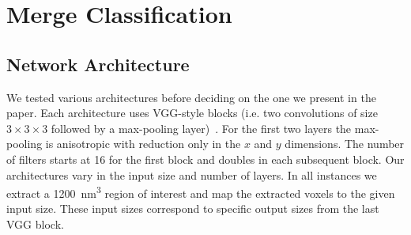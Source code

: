 \section{Merge Classification}

\subsection{Network Architecture}

We tested various architectures before deciding on the one we present in the paper. 
Each architecture uses VGG-style blocks (i.e. two convolutions of size $3\times3\times3$ followed by a max-pooling layer)~\cite{chatfield2014return}.
For the first two layers the max-pooling is anisotropic with reduction only in the $x$ and $y$ dimensions. 
The number of filters starts at 16 for the first block and doubles in each subsequent block.
Our architectures vary in the input size and number of layers. 
In all instances we extract a \SI{1200}{\nano\meter^3} region of interest and map the extracted voxels to the given input size. 
These input sizes correspond to specific output sizes from the last VGG block.

